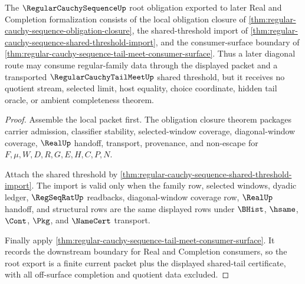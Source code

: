 \begin{theorem}
\label{thm:regular-cauchy-sequence-root-obligation-export}
The $\RegularCauchySequenceUp$ root obligation exported to later Real and Completion formalization consists of the local obligation closure of \autoref{thm:regular-cauchy-sequence-obligation-closure}, the shared-threshold import of \autoref{thm:regular-cauchy-sequence-shared-threshold-import}, and the consumer-surface boundary of \autoref{thm:regular-cauchy-sequence-tail-meet-consumer-surface}. Thus a later diagonal route may consume regular-family data through the displayed packet and a transported $\RegularCauchyTailMeetUp$ shared threshold, but it receives no quotient stream, selected limit, host equality, choice coordinate, hidden tail oracle, or ambient completeness theorem.
\end{theorem}
\begin{proof}
Assemble the local packet first. The obligation closure theorem packages carrier admission, classifier stability, selected-window coverage, diagonal-window coverage, $\RealUp$ handoff, transport, provenance, and non-escape for $F,\mu,W,D,R,G,E,H,C,P,N$.

Attach the shared threshold by \autoref{thm:regular-cauchy-sequence-shared-threshold-import}. The import is valid only when the family row, selected windows, dyadic ledger, $\RegSeqRatUp$ readbacks, diagonal-window coverage row, $\RealUp$ handoff, and structural rows are the same displayed rows under $\BHist$, $\hsame$, $\Cont$, $\Pkg$, and $\NameCert$ transport.

Finally apply \autoref{thm:regular-cauchy-sequence-tail-meet-consumer-surface}. It records the downstream boundary for Real and Completion consumers, so the root export is a finite current packet plus the displayed shared-tail certificate, with all off-surface completion and quotient data excluded.
\end{proof}

